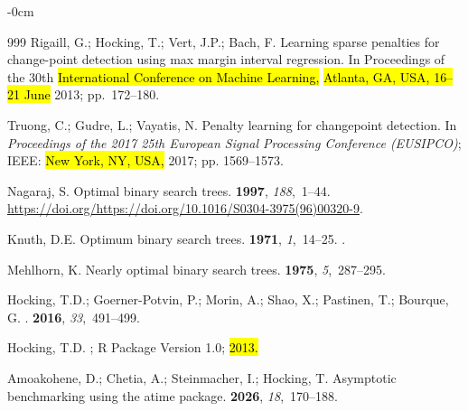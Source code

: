 \documentclass[algorithms,article,accept,oneauthor]{Definitions/mdpi}
\begin{document}
\begin{adjustwidth}{-\extralength}{0cm}
\begin{thebibliography}{999}
Rigaill, G.; Hocking, T.; Vert, J.P.; Bach, F.
\newblock Learning sparse penalties for change-point detection using max margin
  interval regression.
\newblock In Proceedings of the 30th \hl{International Conference on Machine Learning,} %
 \hl{Atlanta, GA,  USA, 16--21 June} 2013; \mbox{pp. 172--180.}

Truong, C.; Gudre, L.; Vayatis, N.
\newblock Penalty learning for changepoint detection.
\newblock In \textit{Proceedings of the 2017 25th European Signal Processing Conference
  (EUSIPCO)}; IEEE: \hl{New York, NY, USA,} 2017; pp. 1569--1573.

Nagaraj, S.
\newblock Optimal binary search trees.
 {\bf 1997}, {\em 188},~1--44.
\newblock
  {\url{https://doi.org/https://doi.org/10.1016/S0304-3975(96)00320-9}}.

Knuth, D.E.
\newblock Optimum binary search trees.
 {\bf 1971}, {\em 1},~14--25.
.

Mehlhorn, K.
\newblock Nearly optimal binary search trees.
 {\bf 1975}, {\em 5},~287--295.

Hocking, T.D.; Goerner-Potvin, P.; Morin, A.; Shao, X.; Pastinen, T.; Bourque,
  G.
.
 {\bf 2016}, {\em 33},~491--499.

Hocking, T.D.
; R Package Version 1.0;  \hl{2013.} %

 

Amoakohene, D.; Chetia, A.; Steinmacher, I.; Hocking, T.
\newblock Asymptotic benchmarking using the atime package.
 {\bf 2026}, {\em 18},~170--188.

\end{thebibliography}
\PublishersNote{}
\end{adjustwidth}
\end{document}

